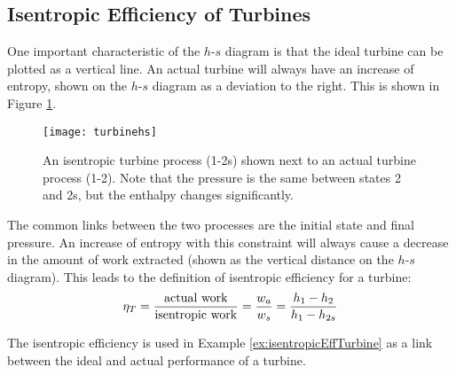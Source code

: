 \subsection{Isentropic Efficiency of Turbines} \label{sec:turbine_eff}
One important characteristic of the $h$-$s$ diagram is that the ideal turbine can be plotted as a vertical line.  An actual turbine will always have an increase of entropy, shown on the $h$-$s$ diagram as a deviation to the right. This is shown in Figure \ref{fig:turbine_eff}.
\begin{figure}[H]
  \centering
  \texttt{[image: turbinehs]}
  \caption{An isentropic turbine process (1-2s) shown next to an actual turbine process (1-2).  Note that the pressure is the same between states 2 and 2s, but the enthalpy changes significantly.}
  \label{fig:turbine_eff}
\end{figure}
The common links between the two processes are the initial state and final pressure.  An increase of entropy with this constraint will always cause a decrease in the amount of work extracted (shown as the vertical distance on the $h$-$s$ diagram).  This leads to the definition of isentropic efficiency for a turbine:
\begin{equation} \label{eq:turbine_eff}
  \eta_T = \frac{\rm actual\ work}{\rm isentropic\ work} = \frac{w_a}{w_s} = \frac{h_1 - h_{2}}{h_1 - h_{2s}}
\end{equation}

The isentropic efficiency is used in Example \ref{ex:isentropicEffTurbine} as a link between the ideal and actual performance of a turbine.

